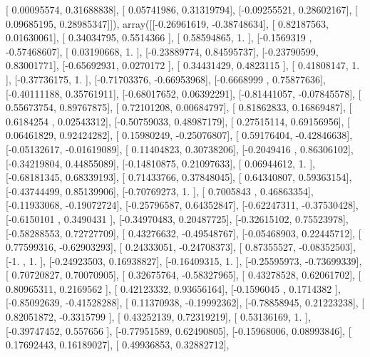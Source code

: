 \documentclass{article}
\begin{document}
       [ 0.00095574,  0.31688838],
       [ 0.05741986,  0.31319794],
       [-0.09255521,  0.28602167],
       [ 0.09685195,  0.28985347]]), array([[-0.26961619, -0.38748634],
       [ 0.82187563,  0.01630061],
       [ 0.34034795,  0.5514366 ],
       [ 0.58594865,  1.        ],
       [-0.1569319 , -0.57468607],
       [ 0.03190668,  1.        ],
       [-0.23889774,  0.84595737],
       [-0.23790599,  0.83001771],
       [-0.65692931,  0.0270172 ],
       [ 0.34431429,  0.4823115 ],
       [ 0.41808147,  1.        ],
       [-0.37736175,  1.        ],
       [-0.71703376, -0.66953968],
       [-0.6668999 ,  0.75877636],
       [-0.40111188,  0.35761911],
       [-0.68017652,  0.06392291],
       [-0.81441057, -0.07845578],
       [ 0.55673754,  0.89767875],
       [ 0.72101208,  0.00684797],
       [ 0.81862833,  0.16869487],
       [ 0.6184254 ,  0.02543312],
       [-0.50759033,  0.48987179],
       [ 0.27515114,  0.69156956],
       [ 0.06461829,  0.92424282],
       [ 0.15980249, -0.25076807],
       [ 0.59176404, -0.42846638],
       [-0.05132617, -0.01619089],
       [ 0.11404823,  0.30738206],
       [-0.2049416 ,  0.86306102],
       [-0.34219804,  0.44855089],
       [-0.14810875,  0.21097633],
       [ 0.06944612,  1.        ],
       [-0.68181345,  0.68339193],
       [ 0.71433766,  0.37848045],
       [ 0.64340807,  0.59363154],
       [-0.43744499,  0.85139906],
       [-0.70769273,  1.        ],
       [ 0.7005843 ,  0.46863354],
       [-0.11933068, -0.19072724],
       [-0.25796587,  0.64352847],
       [-0.62247311, -0.37530428],
       [-0.6150101 ,  0.3490431 ],
       [-0.34970483,  0.20487725],
       [-0.32615102,  0.75523978],
       [-0.58288553,  0.72727709],
       [ 0.43276632, -0.49548767],
       [-0.05468903,  0.22445712],
       [ 0.77599316, -0.62903293],
       [ 0.24333051, -0.24708373],
       [ 0.87355527, -0.08352503],
       [-1.        ,  1.        ],
       [-0.24923503,  0.16938827],
       [-0.16409315,  1.        ],
       [-0.25595973, -0.73699339],
       [ 0.70720827,  0.70070905],
       [ 0.32675764, -0.58327965],
       [ 0.43278528,  0.62061702],
       [ 0.80965311,  0.2169562 ],
       [ 0.42123332,  0.93656164],
       [-0.1596045 ,  0.1714382 ],
       [-0.85092639, -0.41528288],
       [ 0.11370938, -0.19992362],
       [-0.78858945,  0.21223238],
       [ 0.82051872, -0.3315799 ],
       [ 0.43252139,  0.72319219],
       [ 0.53136169,  1.        ],
       [-0.39747452,  0.557656  ],
       [-0.77951589,  0.62490805],
       [-0.15968006,  0.08993846],
       [ 0.17692443,  0.16189027],
       [ 0.49936853,  0.32882712],
\end{document}
